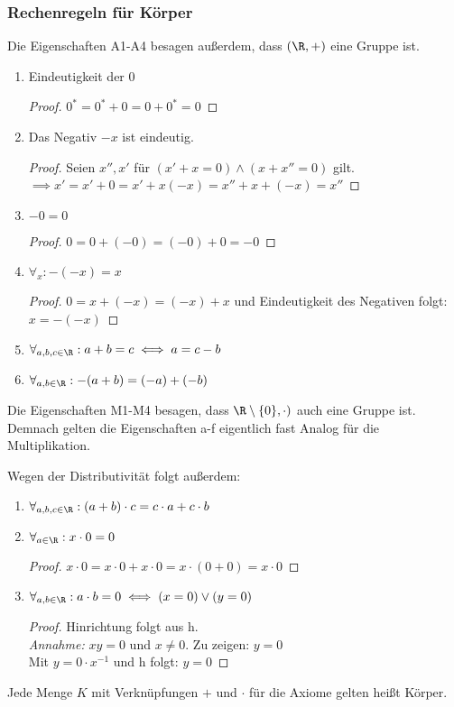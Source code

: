 \subsubsection*{Rechenregeln für Körper}
\begin{remark}
Die Eigenschaften A1-A4 besagen außerdem, dass $(\R,+)$ eine Gruppe ist.
\end{remark}
\begin{enumerate}
	\item Eindeutigkeit der $0$
		\begin{proof}
		$0^{*}= 0^{*}+0 = 0+0^{*}=0$ 
		\end{proof}
	\item Das Negativ $-x$ ist eindeutig.
		\begin{proof}
		Seien $x'', x'$ für $(x'+x=0) \wedge (x+x'' =0) $ gilt. \\
		$\implies x'=x'+0 = x'+x(-x) = x'' +x+(-x) = x''$ 
		\end{proof}
	\item $-0 = 0$
		\begin{proof}
		$0= 0+(-0) = (-0)+0= -0$
		\end{proof}
	\item $\forall_{x}: -(-x) = x $
		\begin{proof}
		$0=x+(-x)= (-x)+x$ und Eindeutigkeit des Negativen folgt: $x=-(-x)$   
		\end{proof}
	\item $\forall_{a,b,c \in \R}: a+b= c \iff a = c-b$
	\item $\forall_{a,b \in \R}: -(a+b) = (-a) + (-b) $ 
\end{enumerate}
\begin{remark}
Die Eigenschaften M1-M4 besagen, dass $\R \setminus \{0\}, \cdot )$ auch eine Gruppe ist. Demnach gelten die Eigenschaften a-f eigentlich fast Analog für die Multiplikation.
\end{remark}
Wegen der Distributivität folgt außerdem:
\begin{enumerate}[resume]
	\item $\forall_{a,b,c \in \R}: (a+b) \cdot c = c\cdot a + c\cdot b $ 
	\item $\forall_{a \in \R}: x\cdot 0=0 $
		\begin{proof}
		$x\cdot 0=x\cdot 0+x\cdot 0 = x \cdot (0+0) = x\cdot 0$ 
		\end{proof}
	\item $\forall_{a,b \in \R}: a \cdot b = 0 \iff (x=0) \vee (y=0)$
		\begin{proof}
		Hinrichtung folgt aus h. \\
		\emph{Annahme:} $xy=0$ und $x\neq 0$. Zu zeigen: $y=0$\\
		Mit $y=0\cdot x^{-1}$ und h folgt: $y=0$ 
		\end{proof}
\end{enumerate}
\begin{remark}
Jede Menge $K$ mit Verknüpfungen $+$ und $\cdot$ für die Axiome gelten heißt Körper.  
\end{remark}

